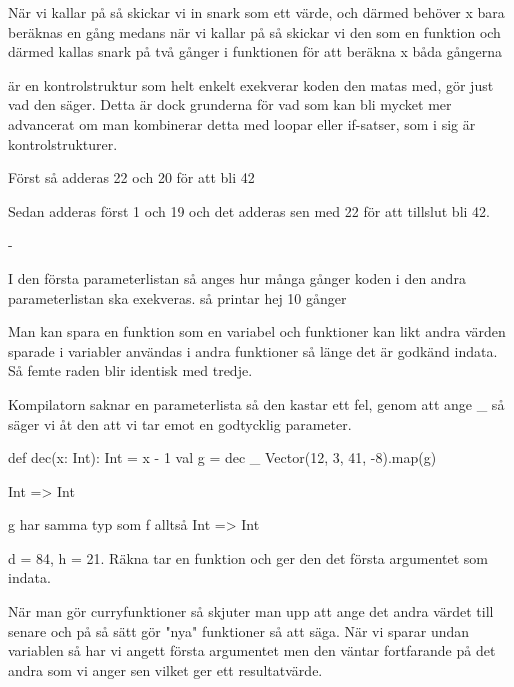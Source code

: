 \Subtask {}

\Subtask När vi kallar på  så skickar vi in snark som ett värde, och därmed behöver x bara beräknas en gång medans när vi kallar på  så skickar vi den som en funktion och därmed kallas snark på två gånger i funktionen för att beräkna x båda gångerna


\Subtask {} är en kontrolstruktur som helt enkelt exekverar koden den matas med,  gör just vad den säger. Detta är dock grunderna för vad som kan bli mycket mer advancerat om man kombinerar detta med loopar eller if-satser, som i sig är kontrolstrukturer.

\Task Först så adderas 22 och 20 för att bli 42

Sedan adderas först 1 och 19 och det adderas sen med 22 för att tillslut bli 42.

\Task

\Subtask -

\Subtask I den första parameterlistan så anges hur många gånger koden i den andra parameterlistan ska exekveras. så  printar hej 10 gånger

\Task

\Subtask Man kan spara en funktion som en variabel och funktioner kan likt andra värden sparade i variabler användas i andra funktioner så länge det är godkänd indata. Så femte raden blir identisk med tredje.

\Subtask Kompilatorn saknar en parameterlista så den kastar ett fel, genom att ange \_ så säger vi åt den att vi tar emot en godtycklig parameter.

\Subtask 
\begin{REPLnonum}
def dec(x: Int): Int = x - 1
val g = dec _
Vector(12, 3, 41, -8).map(g)
\end{REPLnonum}

\Subtask Int => Int

g har samma typ som f alltså  Int => Int

\Subtask d = 84, h = 21. Räkna tar en funktion och ger den det första argumentet som indata.

\Task När man gör curryfunktioner så skjuter man upp att ange det andra värdet till senare och på så sätt gör "nya" funktioner så att säga. När vi sparar undan variablen  så har vi angett första argumentet men den väntar fortfarande på det andra som vi anger sen vilket ger ett resultatvärde. 

